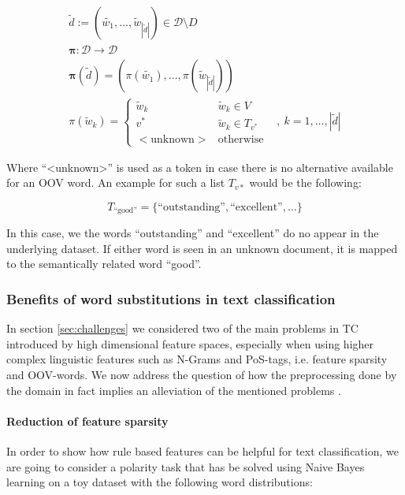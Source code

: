 \begin{eqnarray*}
\tilde{d} := (\tilde{w_1},\ldots,\tilde{w}_{|\tilde{d}|}) \in
\mathcal{D}\setminus D
\\
\boldsymbol\pi: \mathcal{D} \to \mathcal{D} \\
\boldsymbol\pi(\tilde{d}) =
(\pi(\tilde{w_1}),\ldots,\pi(\tilde{w}_{|\tilde{d}|})) \\
\pi(\tilde{w}_k) = \begin{cases} \tilde{w}_k & \tilde{w}_k \in V  \\
v^* & \tilde{w}_k \in T_{v^*} \\
\mathrm{<unknown>} & \mathrm{otherwise} \end{cases}& ,~k=1,\ldots,|\tilde{d}|
\end{eqnarray*}

Where ``<unknown>'' is used as a token in case there is no alternative available
for an OOV word.
An example for such a list $T_{v*}$ would be the following:

\begin{equation*}
T_{\text{``good''}} = \{\text{``outstanding''}, \text{``excellent''}, \ldots\}
\end{equation*}

In this case, we the words ``outstanding'' and ``excellent'' do no
appear in the underlying dataset. If either word is seen in an unknown
document, it is mapped to the semantically related word ``good''.

\subsubsection{Benefits of word substitutions in text classification}

In section \ref{sec:challenges} we considered two of the main problems in TC
introduced by high dimensional feature spaces, especially when using higher
complex linguistic features such as N-Grams and PoS-tags, i.e. feature sparsity
and OOV-words. We now address the question of how the preprocessing done by the
domain in fact implies an alleviation of the mentioned problems .

\paragraph{Reduction of feature sparsity}
In order to show how rule based features can be helpful for text classification,
we are going to consider a polarity task that has be solved using Naive Bayes
learning on a toy dataset with the following word distributions:


